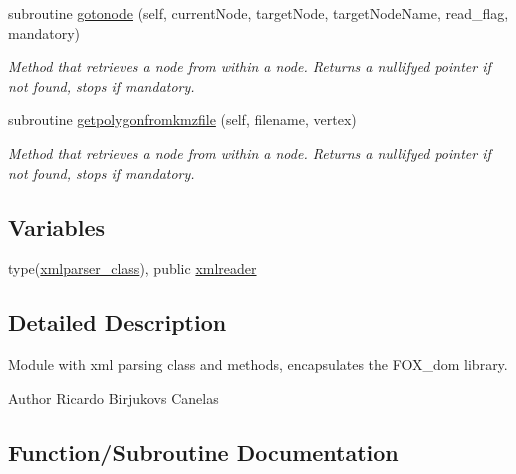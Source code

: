 \begin{DoxyCompactItemize}
subroutine \mbox{\hyperlink{namespacexmlparser__mod_acd860c3d06a25fc422edbcc3d356d976}{gotonode}} (self, current\+Node, target\+Node, target\+Node\+Name, read\+\_\+flag, mandatory)
\begin{DoxyCompactList}\small\item\em Method that retrieves a node from within a node. Returns a nullifyed pointer if not found, stops if mandatory. \end{DoxyCompactList}\item 
subroutine \mbox{\hyperlink{namespacexmlparser__mod_aa62d7fce2037454ba8fad993c6f1c8fd}{getpolygonfromkmzfile}} (self, filename, vertex)
\begin{DoxyCompactList}\small\item\em Method that retrieves a node from within a node. Returns a nullifyed pointer if not found, stops if mandatory. \end{DoxyCompactList}\end{DoxyCompactItemize}
\subsection*{Variables}
\begin{DoxyCompactItemize}
\item 
type(\mbox{\hyperlink{structxmlparser__mod_1_1xmlparser__class}{xmlparser\+\_\+class}}), public \mbox{\hyperlink{namespacexmlparser__mod_a482bd93d0a4ba8c9c2000713a4b14799}{xmlreader}}
\end{DoxyCompactItemize}


\subsection{Detailed Description}
Module with xml parsing class and methods, encapsulates the F\+O\+X\+\_\+dom library. 

\begin{DoxyAuthor}{Author}
Ricardo Birjukovs Canelas 
\end{DoxyAuthor}


\subsection{Function/\+Subroutine Documentation}
\mbox{\label{namespacexmlparser__mod_a9eed98475e0d55a3c7b2eeb88925a48c}} 
